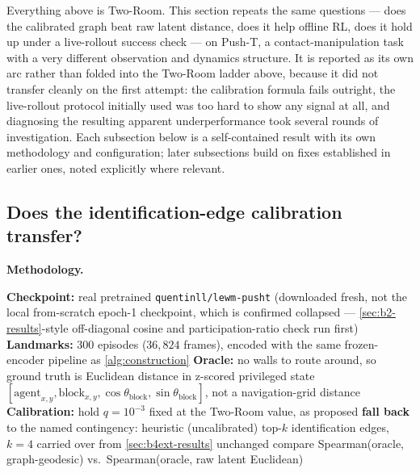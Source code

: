 \documentclass[11pt]{article}
\begin{document}
Everything above is Two-Room. This section repeats the same questions --- does the calibrated
graph beat raw latent distance, does it help offline RL, does it hold up under a live-rollout
success check --- on Push-T, a contact-manipulation task with a very different observation and
dynamics structure. It is reported as its own arc rather than folded into the Two-Room ladder
above, because it did not transfer cleanly on the first attempt: the calibration formula fails
outright, the live-rollout protocol initially used was too hard to show any signal at all, and
diagnosing the resulting apparent underperformance took several rounds of investigation. Each
subsection below is a self-contained result with its own methodology and configuration; later
subsections build on fixes established in earlier ones, noted explicitly where relevant.

\subsection{Does the identification-edge calibration transfer?}
\label{sec:b5-results}

\textbf{Methodology.}

\begin{algorithm}[H]
\caption{Push-T gate-check methodology --- Two-Room's B0 gate, ported to Push-T}
\begin{algorithmic}[1]
\State \textbf{Checkpoint:} real pretrained \texttt{quentinll/lewm-pusht} (downloaded fresh, not the local from-scratch epoch-1 checkpoint, which is confirmed collapsed --- \cref{sec:b2-results}-style off-diagonal cosine and participation-ratio check run first)
\State \textbf{Landmarks:} 300 episodes ($36{,}824$ frames), encoded with the same frozen-encoder pipeline as \cref{alg:construction}
\State \textbf{Oracle:} no walls to route around, so ground truth is Euclidean distance in z-scored privileged state $[\text{agent}_{x,y}, \text{block}_{x,y}, \cos\theta_{\text{block}}, \sin\theta_{\text{block}}]$, not a navigation-grid distance
\State \textbf{Calibration:} hold $q=10^{-3}$ fixed at the Two-Room value, as proposed
    \State \textbf{fall back} to the named contingency: heuristic (uncalibrated) top-$k$ identification edges, $k=4$ carried over from \cref{sec:b4ext-results} unchanged
\EndIf
\State compare Spearman(oracle, graph-geodesic) vs.\ Spearman(oracle, raw latent Euclidean)
\end{algorithmic}
\end{algorithm}
\end{document}
